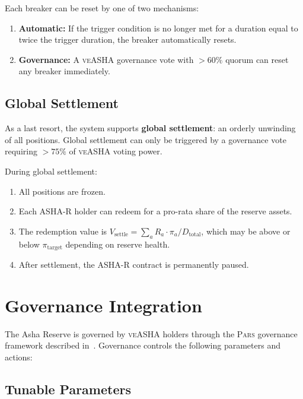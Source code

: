 \documentclass[11pt,a4paper]{article}
\newcommand{\Pars}{\textsc{Pars}\xspace}
\newcommand{\veasha}{\textsc{veASHA}\xspace}
\newcommand{\ashares}{\textsc{ASHA-R}\xspace}
\begin{document}
Each breaker can be reset by one of two mechanisms:

\begin{enumerate}
  \item \textbf{Automatic:} If the trigger condition is no longer met for a duration equal to twice the trigger duration, the breaker automatically resets.
  \item \textbf{Governance:} A \veasha governance vote with $>60\%$ quorum can reset any breaker immediately.
\end{enumerate}

\subsection{Global Settlement}

As a last resort, the system supports \textbf{global settlement}: an orderly unwinding of all positions.
Global settlement can only be triggered by a governance vote requiring $>75\%$ of \veasha voting power.

During global settlement:
\begin{enumerate}
  \item All positions are frozen.
  \item Each \ashares holder can redeem for a pro-rata share of the reserve assets.
  \item The redemption value is $V_{\text{settle}} = \sum_{a} R_a \cdot \pi_a / D_{\text{total}}$, which may be above or below $\pi_{\text{target}}$ depending on reserve health.
  \item After settlement, the \ashares contract is permanently paused.
\end{enumerate}

\section{Governance Integration}
\label{sec:governance}

The Asha Reserve is governed by \veasha holders through the \Pars governance framework described in~\citep{parsgov2026}.
Governance controls the following parameters and actions:

\subsection{Tunable Parameters}
\end{document}
